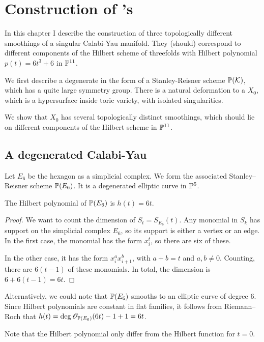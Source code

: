 \chapter{Construction of \CY's}
\label{sec:constructions}

In this chapter I describe the construction of three topologically different smoothings of a singular Calabi-Yau manifold. They (should) correspond to different components of the Hilbert scheme of threefolds with Hilbert polynomial $p(t)=6t^3+6$ in $\P^{11}$. 

We first describe a degenerate \CY in the form of a Stanley-Reisner scheme $\P(\K)$, which has a quite large symmetry group. There is a natural deformation to a $X_0$, which is a hypersurface inside toric variety, with isolated singularities.

We show that $X_0$ has several topologically distinct smoothings, which should lie on different components of the Hilbert scheme in $\P^{11}$.

\section{A degenerated Calabi-Yau}

Let $E_6$ be the hexagon as a simplicial complex. We form the associated Stanley--Reisner scheme $\P(E_6)$. It is a degenerated elliptic curve in $\P^5$.

\begin{lemma}
The Hilbert polynomial of $\P(E_6)$ is $h(t)=6t$.
\end{lemma}
\begin{proof}
We want to count the dimension of $S_t=S_{E_6}(t)$. Any monomial in $S_k$ has support on the simplicial complex $E_6$, so its support is either a vertex or an edge. In the first case, the monomial has the form $x_i^t$, so there are six of these.

In the other case, it has the form $x_i^ax_{i+1}^b$, with $a+b=t$ and $a,b \neq 0$. Counting, there are $6(t-1)$ of these monomials. In total, the dimension is $6+6(t-1)=6t$.
\end{proof}
\begin{remark}
Alternatively, we could note that $\P(E_6)$ smooths to an elliptic curve of degree $6$. Since Hilbert polynomials are constant in flat families, it follows from Riemann--Roch that $h(t)=\deg \OO_{\P(E_6)}(6t)-1+1=6t$.
\end{remark}

Note that the Hilbert polynomial only differ from the Hilbert function for $t=0$.

